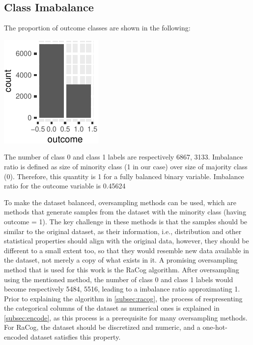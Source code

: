 \documentclass{article}
\begin{document}
\hypertarget{class-imabalance}{%
\subsection{\texorpdfstring{Class Imabalance
\label{subsec:imbalance}}{Class Imabalance }}\label{class-imabalance}}

The proportion of outcome classes are shown in the following:

\begin{center}\includegraphics{report_files/figure-latex/unnamed-chunk-6-1} \end{center}

The number of class 0 and class 1 labels are respectively 6867, 3133.
Imbalance ratio is defined as size of minority class (1 in our case)
over size of majority class (0). Therefore, this quantity is 1 for a
fully balanced binary variable. Imbalance ratio for the outcome variable
is 0.45624

To make the dataset balanced, oversampling methods can be used, which
are methods that generate samples from the dataset with the minority
class (having outcome = 1). The key challenge in these methods is that
the samples should be similar to the original dataset, as their
information, i.e., distribution and other statistical properties should
align with the original data, however, they should be different to a
small extent too, so that they would resemble new data available in the
dataset, not merely a copy of what exists in it. A promising
oversampling method that is used for this work is the RaCog algorithm.
After oversampling using the mentioned method, the number of class 0 and
class 1 labels would become respectively 5484, 5516, leading to a
imbalance ratio approximating 1. Prior to explaining the algorithm in
\ref{subsec:racog}, the process of respresenting the categorical columns
of the dataset as numerical ones is explained in \ref{subsec:encode}, as
this process is a prerequisite for many oversampling methods. For RaCog,
the dataset should be discretized and numeric, and a one-hot-encoded
dataset satisfies this property.
\end{document}
